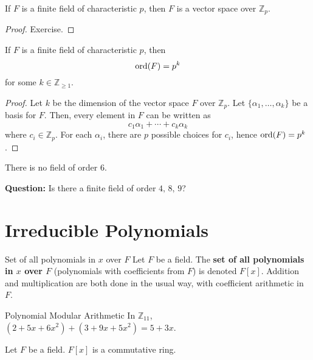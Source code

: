 \begin{Theorem}{}{}
    If $ F $ is a finite field of characteristic $ p $, then $ F $
    is a vector space over $ \mathbb{Z}_p $.
\end{Theorem}

\begin{proof}
    Exercise.
\end{proof}

\begin{Theorem}{}{}
    If $ F $ is a finite field of characteristic $ p $, then
    \[ \operatorname{ord}(F)=p^k \]
    for some $ k\in\mathbb{Z}_{\geqslant 1} $.
\end{Theorem}

\begin{proof}
    Let $ k $ be the dimension of the vector space $ F $ over $ \mathbb{Z}_p $.
    Let $ \{\alpha_1,\ldots ,\alpha_k\} $ be a basis for $ F $. Then, every element
    in $ F $ can be written as
    \[ c_1\alpha_1+\cdots+c_k\alpha_k \]
    where $ c_i\in\mathbb{Z}_p $. For each $ \alpha_i $, there are $ p $
    possible choices for $ c_i $, hence $ \operatorname{ord}(F)=p^k $.
\end{proof}

\begin{Example}{}{}
    There is no field of order $ 6 $.
\end{Example}

\textbf{Question:} Is there a finite field of order $ 4,\,8,\,9 $?

\section{Irreducible Polynomials}

\begin{Definition}{Set of all polynomials in $ x $ over $ F $}{}
    Let $ F $ be a field. The \textbf{set of all polynomials in $ x $ over $ F $}
    (polynomials with coefficients from $ F $) is denoted $ F[x] $. Addition
    and multiplication are both done in the usual way, with coefficient arithmetic
    in $ F $.
\end{Definition}

\begin{Example}{Polynomial Modular Arithmetic}{}
    In $ \mathbb{Z}_{11} $, $ (2+5x+6x^2)+(3+9x+5x^2)=5+3x $.
\end{Example}

\begin{Theorem}{}{}
    Let $ F $ be a field. $ F[x] $ is a commutative ring.
\end{Theorem}


